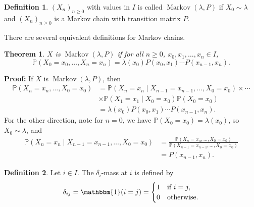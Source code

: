 \documentclass[12pt]{article}
\DeclareMathOperator{\Mkv}{Markov}
\newtheorem{theorem}{Theorem}[section]
\theoremstyle{definition}
\newtheorem{definition}{Definition}[section]
\theoremstyle{remark}
\begin{document}
\begin{definition}
	$(X_n)_{n \geq 0}$ with values in $I$ is called $\Mkv(\lambda, P)$ if $X_0 \sim \lambda$ and $(X_n)_{n \geq 0}$ is a Markov chain with transition matrix $P$.
\end{definition}

There are several equivalent definitions for Markov chains.

\begin{theorem}
	$X$ is $\Mkv(\lambda, P)$ if for all $n \geq 0$, $x_0, x_1, \ldots, x_n \in I$,
	\[
		\mathbb{P}(X_0 = x_0, \ldots, X_n = x_n) = \lambda(x_0)P(x_0,x_1) \cdots P(x_{n-1}, x_n)
	.\]
\end{theorem}

\begin{adjustbox}{minipage = \columnwidth - 25.5pt, margin=1em, frame=1pt, margin=0em}
	\textbf{Proof:} If $X$ is $\Mkv(\lambda, P)$, then 
	\begin{align*}
		\mathbb{P}(X_n = x_n, \ldots, X_0 = x_0) &= \mathbb{P}(X_n = x_n \mid X_{n-1} = x_{n-1}, \ldots, X_0 = x_0) \times \cdots \\
							 & \times \mathbb{P}(X_1 = x_1 \mid X_0 = x_0) \mathbb{P}(X_0 = x_0) \\
							 &= \lambda(x_0)P(x_0,x_1)\cdots P(x_{n-1}, x_n).
	\end{align*}
	For the other direction, note for $n = 0$, we have $\mathbb{P}(X_0 = x_0) = \lambda(x_0)$, so $X_0 \sim \lambda$, and
	\begin{align*}
		\mathbb{P}(X_n = x_n \mid X_{n-1} = x_{n-1}, \ldots, X_0 = x_0) &= \frac{\mathbb{P}(X_n = x_n, \ldots, X_0 = x_0)}{\mathbb{P}(X_{n-1} = x_{n-1}, \ldots, X_0 = x_0)} \\
										&= P(x_{n-1}, x_n).
	\end{align*}
\end{adjustbox}

\begin{definition}
	Let $i \in I$. The $\delta_{i}$-mass at $i$ is defined by
	\[
		\delta_{ij} = \mathbbm{1}(i = j) =
		\begin{cases}
			1 & \text{if } i = j, \\
			0 & \text{otherwise}.
		\end{cases}	
	\] 
\end{definition}
\end{document}
